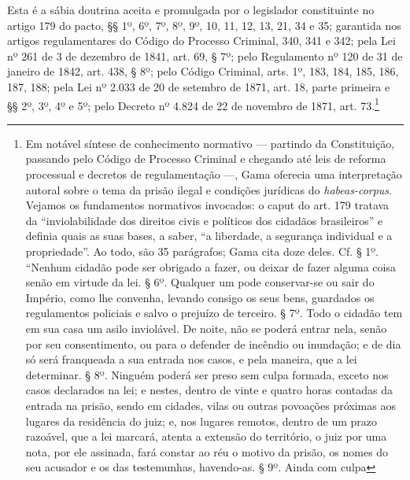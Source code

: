 Esta é a sábia doutrina aceita e promulgada por o legislador
constituinte no artigo 179 do pacto, §§ 1º, 6º, 7º, 8º, 9º, 10, 11, 12,
13, 21, 34 e 35; garantida nos artigos regulamentares do Código do
Processo Criminal, 340, 341 e 342; pela Lei nº 261 de 3 de dezembro de
1841, art. 69, § 7º; pelo Regulamento nº 120 de 31 de janeiro de 1842,
art. 438, § 8º; pelo Código Criminal, arts. 1º, 183, 184, 185, 186, 187,
188; pela Lei nº 2.033 de 20 de setembro de 1871, art. 18, parte
primeira e §§ 2º, 3º, 4º e 5º; pelo Decreto nº 4.824 de 22 de novembro
de 1871, art. 73.\footnote{Em notável síntese de conhecimento
  normativo --- partindo da Constituição, passando pelo Código de Processo
  Criminal e chegando até leis de reforma processual e decretos de
  regulamentação ---, Gama oferecia uma interpretação autoral sobre o
  tema da prisão ilegal e condições jurídicas do \emph{habeas-corpus}.
  Vejamos os fundamentos normativos invocados: o caput do art. 179
  tratava da ``inviolabilidade dos direitos civis e políticos dos
  cidadãos brasileiros'' e definia quais as suas bases, a saber, ``a
  liberdade, a segurança individual e a propriedade''. Ao todo, são 35
  parágrafos; Gama cita doze deles. Cf. § 1º. ``Nenhum cidadão pode ser
  obrigado a fazer, ou deixar de fazer alguma coisa senão em virtude da
  lei. § 6º. Qualquer um pode conservar-se ou sair do Império,
  como lhe convenha, levando consigo os seus bens, guardados os
  regulamentos policiais e salvo o prejuízo de terceiro. § 7º. Todo o
  cidadão tem em sua casa um asilo inviolável. De noite, não se poderá
  entrar nela, senão por seu consentimento, ou para o defender de
  incêndio ou inundação; e de dia só será franqueada a sua entrada nos
  casos, e pela maneira, que a lei determinar. § 8º. Ninguém poderá ser %
  preso sem culpa formada, exceto nos casos declarados na lei; e nestes,
  dentro de vinte e quatro horas contadas da entrada na prisão, sendo em
  cidades, vilas ou outras povoações próximas aos lugares da residência
  do juiz; e, nos lugares remotos, dentro de um prazo razoável, que a
  lei marcará, atenta a extensão do território, o juiz por uma nota, por
  ele assinada, fará constar ao réu o motivo da prisão, os nomes do seu
  acusador e os das testemunhas, havendo-as. § 9º. Ainda com culpa
}
